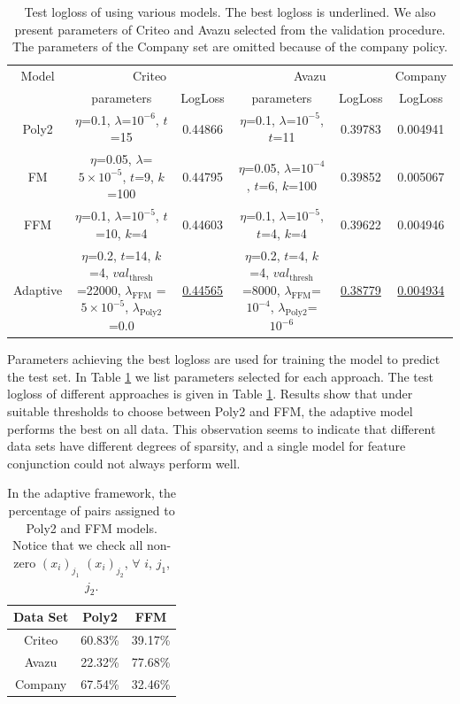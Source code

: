 \begin{table}[!htb]
	\centering
	\caption{ Test logloss of using various models. The best logloss is underlined. We also present parameters of Criteo and Avazu selected from the validation procedure. The parameters of the Company set are omitted because of the company policy.}
	\label{tab2}
	\begin{tabular}{|c|c|c|c|c|c|}
		\hline
		Model&\multicolumn{2}{c|}{Criteo}&\multicolumn{2}{c|}{Avazu}&\multicolumn{1}{c|}{Company} \\
		\cline{2-6}
		&parameters&LogLoss&parameters&LogLoss&LogLoss\\
		\hline
		Poly2&$\eta$=0.1, $\lambda$=$10^{-6}$, $t$=15&0.44866&$\eta$=0.1, $\lambda$=$10^{-5}$, $t$=11&0.39783&0.004941 \\
		\hline
		FM&$\eta$=0.05, $\lambda$=$5\times10^{-5}$, $t$=9, $k$=100&0.44795&$\eta$=0.05, $\lambda$=$10^{-4}$, $t$=6, $k$=100&0.39852&0.005067 \\
		\hline
		FFM&$\eta$=0.1, $\lambda$=$10^{-5}$, $t$=10, $k$=4&0.44603&$\eta$=0.1, $\lambda$=$10^{-5}$, $t$=4, $k$=4&0.39622&0.004946 \\
		\hline
		Adaptive&\tabincell{c}{$\eta$=0.2, $t$=14, $k$=4, $val_{\text{thresh}}$ =22000,\\$\lambda_{\text{FFM}}$ =$5\times10^{-5}$, $\lambda_{\text{Poly2}}$ =0.0}&\underline{0.44565}&\tabincell{c}{$\eta$=0.2, $t$=4, $k$=4, $val_{\text{thresh}}$=8000, \\$\lambda_{\text{FFM}}$=$10^{-4}$, $\lambda_{\text{Poly2}}$=$10^{-6}$}&\underline{0.38779}&\underline{0.004934} \\
		\hline
	\end{tabular}
\end{table}

Parameters achieving the best logloss are used for training the model to predict the test set. In Table \ref{tab2} we list parameters selected for each approach. The test logloss of different approaches is given in Table \ref{tab2}. Results show that under suitable thresholds to choose between Poly2 and FFM, the adaptive model performs the best on all data. This observation seems to indicate that different data sets have different degrees of sparsity, and a single model for feature conjunction could not always perform well.

\begin{table}[ht]
	\caption{In the adaptive framework, the percentage of pairs assigned to Poly2 and FFM models. Notice that we check all non-zero $(x_i)_{j_1}$ $(x_i)_{j_2}$, ${\forall}$ $i$, $j_1$, $j_2$.}
	\label{tab3}
	\centering
	\begin{tabular}{|c|c|c|}
		\hline
		Data Set & Poly2 & FFM  \\
		\hline
		Criteo & 60.83\% & 39.17\%  \\
		\hline
		Avazu &  22.32\% & 77.68\%  \\
		\hline
		Company & 67.54\% & 32.46\%  \\
		\hline
	\end{tabular}
\end{table}


